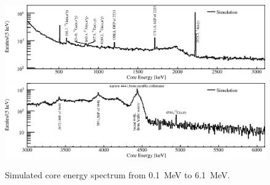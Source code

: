 \begin{figure}[tbhp]
  \centering
  \includegraphics[width=\textwidth,clip]{spectra_mc1}
  \includegraphics[width=\textwidth,clip]{spectra_mc2}
  \caption{Simulated core energy spectrum from 0.1~MeV to 6.1~MeV.}
  \label{fig:neu:mca}
\end{figure}

